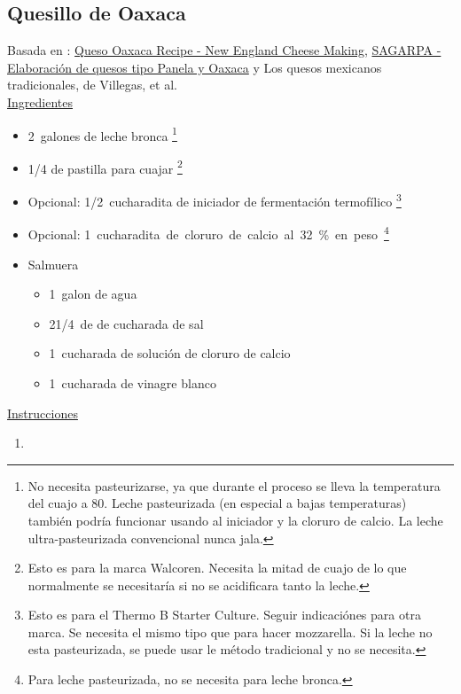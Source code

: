 \subsection{Quesillo de Oaxaca}

Basada en : \href{https://cheesemaking.com/products/queso-oaxaca-recipe}{Queso Oaxaca Recipe - New England Cheese Making},  \href{http://www.sagarpa.gob.mx/desarrolloRural/Documents/fichasaapt/Elaboraci%C3%B3n%20de%20quesos.pdf}{SAGARPA - Elaboración de quesos tipo Panela y Oaxaca} y Los quesos mexicanos tradicionales, de Villegas, et al. \\

\underline{Ingredientes}
\begin{itemize}
\item \SI{2}{galones} de leche bronca \footnote{No necesita pasteurizarse, ya que durante el proceso se lleva la temperatura del cuajo a 80. Leche pasteurizada (en especial a bajas temperaturas) también podría funcionar usando al iniciador y la cloruro de calcio. La leche ultra-pasteurizada convencional nunca jala.}
\item \num{1/4} de pastilla para cuajar \footnote{Esto es para la marca Walcoren. Necesita la mitad de cuajo de lo que normalmente se necesitaría si no se acidificara tanto la leche.} 
\item Opcional: \SI{1/2}{cucharadita} de iniciador de fermentación termofílico \footnote{Esto es para el Thermo B Starter Culture. Seguir indicaciónes para otra marca. Se necesita el mismo tipo que para hacer mozzarella. Si la leche no esta pasteurizada, se puede usar le método tradicional y no se necesita.}
\item Opcional: \SI{1} cucharadita de cloruro de calcio al 32\% en peso \footnote{Para leche pasteurizada, no se necesita para leche bronca.}
\item Salmuera
\begin{itemize}
\item \SI{1}{galon} de agua
\item 2\SI{1/4}{de} de cucharada de sal
\item \SI{1}{cucharada} de solución de cloruro de calcio
\item \SI{1}{cucharada} de vinagre blanco
\end{itemize}
\end{itemize}


\underline{Instrucciones}
\begin{enumerate}
\item 
\end{enumerate}
